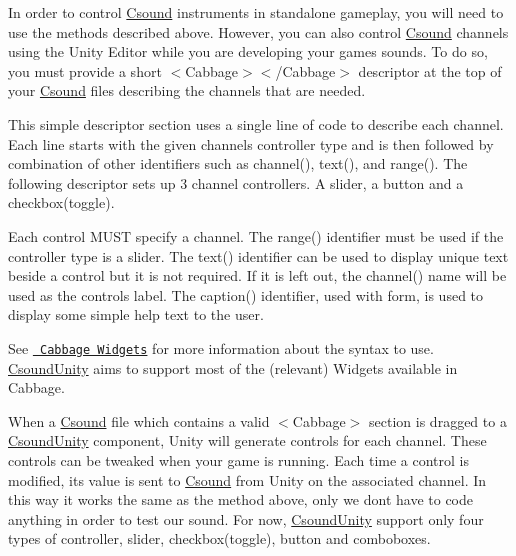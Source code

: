 In order to control \mbox{\hyperlink{namespace_csound}{Csound}} instruments in standalone gameplay, you will need to use the methods described above. However, you can also control \mbox{\hyperlink{namespace_csound}{Csound}} channels using the Unity Editor while you are developing your game\textquotesingle{}s sounds. To do so, you must provide a short $<$\+Cabbage$>$$<$/\+Cabbage$>$ descriptor at the top of your \mbox{\hyperlink{namespace_csound}{Csound}} files describing the channels that are needed.

This simple descriptor section uses a single line of code to describe each channel. Each line starts with the given channel\textquotesingle{}s controller type and is then followed by combination of other identifiers such as channel(), text(), and range(). The following descriptor sets up 3 channel controllers. A slider, a button and a checkbox(toggle).


\begin{DoxyCode}{0}

\end{DoxyCode}


Each control MUST specify a channel. The range() identifier must be used if the controller type is a slider. The text() identifier can be used to display unique text beside a control but it is not required. If it is left out, the channel() name will be used as the control\textquotesingle{}s label. The caption() identifier, used with form, is used to display some simple help text to the user.

See \href{https://cabbageaudio.com/docs/cabbage_syntax/}{\texttt{ Cabbage Widgets}} for more information about the syntax to use. \mbox{\hyperlink{class_csound_unity}{Csound\+Unity}} aims to support most of the (relevant) Widgets available in Cabbage.

When a \mbox{\hyperlink{namespace_csound}{Csound}} file which contains a valid $<$\+Cabbage$>$ section is dragged to a \mbox{\hyperlink{class_csound_unity}{Csound\+Unity}} component, Unity will generate controls for each channel. These controls can be tweaked when your game is running. Each time a control is modified, its value is sent to \mbox{\hyperlink{namespace_csound}{Csound}} from Unity on the associated channel. In this way it works the same as the method above, only we don\textquotesingle{}t have to code anything in order to test our sound. For now, \mbox{\hyperlink{class_csound_unity}{Csound\+Unity}} support only four types of controller, slider, checkbox(toggle), button and comboboxes. 